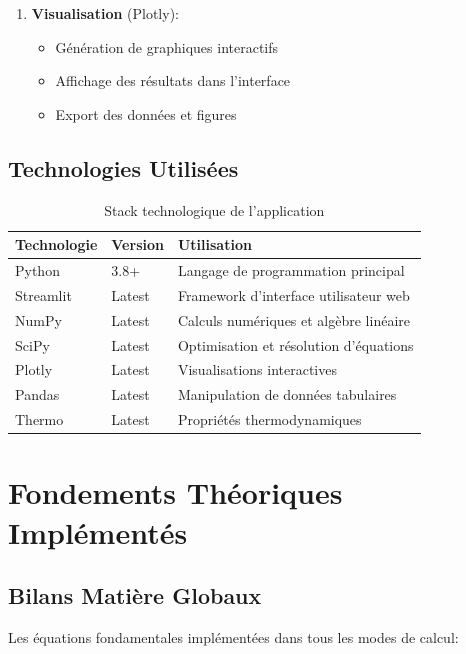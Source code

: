 \documentclass[11pt,a4paper]{article}
\begin{document}
\begin{enumerate}[leftmargin=*]
    \item \textbf{Visualisation} (Plotly):
    \begin{itemize}
        \item Génération de graphiques interactifs
        \item Affichage des résultats dans l'interface
        \item Export des données et figures
    \end{itemize}
\end{enumerate}

\subsection{Technologies Utilisées}

\begin{table}[h]
\centering
\begin{tabular}{llp{6cm}}
\toprule
\textbf{Technologie} & \textbf{Version} & \textbf{Utilisation} \\
\midrule
Python & 3.8+ & Langage de programmation principal \\
Streamlit & Latest & Framework d'interface utilisateur web \\
NumPy & Latest & Calculs numériques et algèbre linéaire \\
SciPy & Latest & Optimisation et résolution d'équations \\
Plotly & Latest & Visualisations interactives \\
Pandas & Latest & Manipulation de données tabulaires \\
Thermo & Latest & Propriétés thermodynamiques \\
\bottomrule
\end{tabular}
\caption{Stack technologique de l'application}
\end{table}

\section{Fondements Théoriques Implémentés}

\subsection{Bilans Matière Globaux}

Les équations fondamentales implémentées dans tous les modes de calcul:
\end{document}
